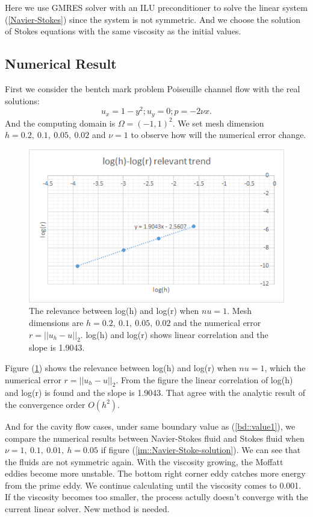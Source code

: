 \documentclass[a4paper]{article}
\begin{document}
Here we use GMRES solver with an ILU preconditioner to solve the
linear system (\ref{Navier-Stokes}) since the system is not
symmetric. And we choose the solution of Stokes equations with the
same viscosity as the initial values.

\subsection{Numerical Result}
First we consider the bentch mark problem Poiseuille channel flow with the real solutions:
\begin{equation}
u_x = 1-y^2;  u_y = 0; p=-2\nu x.
\label{pr::accurate}
\end{equation}
And the computing domain is $\Omega = (-1,1)^2$. We set mesh dimension
$h=0.2,\ 0.1,\ 0.05,\ 0.02$ and $\nu=1$ to observe how will the
numerical error change.

\begin{figure}[h]
\centering
\includegraphics[scale = 0.8]{images/convergence.png}
\caption{The relevance between log(h) and log(r) when $nu=1$.  Mesh
  dimensions are $h=0.2,\ 0.1, \ 0.05, \ 0.02$ and the numerical error
  $r=||u_h-u||_2$. log(h) and log(r) shows linear correlation and the
  slope is 1.9043.}
\label{im::log(h)-res}
\end{figure}

Figure (\ref{im::log(h)-res}) shows the relevance between log(h) and
log(r) when $nu=1$, which the numerical error $r=||u_h-u||_2$. From
the figure the linear correlation of log(h) and log(r) is found and
the slope is 1.9043. That agree with the analytic result of the
convergence order $O(h^2)$.

And for the cavity flow cases, under same boundary value as
(\ref{bd::value1}), we compare the numerical results between
Navier-Stokes fluid and Stokes fluid when
$\nu=1,\ 0.1,\ 0.01,\ h=0.05$ if figure
(\ref{im::Navier-Stoke-solution}).  We can see that the fluids are not
symmetric again. With the viscosity growing, the Moffatt eddies become
more unstable. The bottom right corner eddy catches more energy from
the prime eddy. We continue calculating until the viscosity comes to
0.001. If the viscosity becomes too smaller, the process actully doesn't
converge with the current linear solver. New method is needed.
\end{document}

